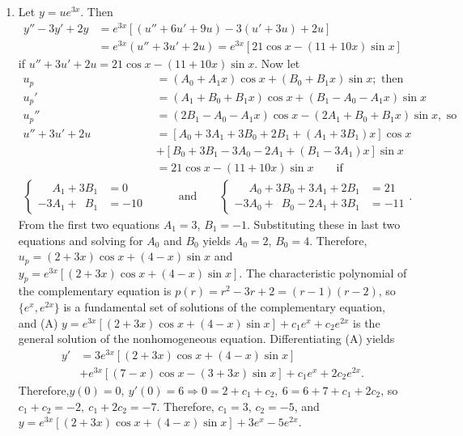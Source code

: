 \documentclass[openany]{book}
\newenvironment{sectionSolutions}{
 \begin{enumerate}[item-label={\thesection.\arabic{enumi}.}]
}{
 \end{enumerate}
}
\begin{document}
\begin{sectionSolutions}
\item
Let $y=ue^{3x}$. Then
\begin{align*}
y''-3y'+2y&=e^{3x}\left[(u''+6u'+9u)-3(u'+3u)+2u\right]\\
&=e^{3x}(u''+3u'+2u)=e^{3x}\left[21\cos x-(11+10x)\sin x\right]
\end{align*}
if $u''+3u'+2u=21\cos x-(11+10x)\sin x$.
Now let
\begin{align*}
u_p&=(A_0+A_1x)\cos x+(B_0+B_1x)\sin x; \text{ then}\\
u_p'&=(A_1+B_0+B_1x)\cos x+(B_1-A_0-A_1x)\sin x\\
u_p''&=(2B_1-A_0-A_1x)\cos x-(2A_1+B_0+B_1x)\sin x, \text{ so}\\
u''+3u'+2u&=\left[A_0+3A_1+3B_0+2B_1+(A_1+3B_1)x\right]\cos x\\
&+\left[B_0+3 B_1-3A_0-2A_1+(B_1-3A_1)x\right]\sin x \\
&=21\cos x-(11+10x)\sin x \qquad\text{if}\\
\begin{cases}
\phantom{-3}A_1+3B_1&=0\\ -3A_1+\phantom{3}B_1&=-10
\end{cases}
&\qquad\text{and}\qquad
\begin{cases}
\phantom{-3} A_0+3B_0+3A_1+2B_1&=21\\
-3A_0+\phantom{3}B_0-2A_1+3B_1&=-11
\end{cases}.
\end{align*}
From the first two equations $A_1=3$, $B_1=-1$. Substituting these in
last two equations %
and solving for $A_0$ and $B_0$ yields
$A_0=2$, $B_0=4$. Therefore,
$u_p=(2+3x)\cos x+(4-x)\sin x$ and
$y_p=e^{3x}\left[(2+3x)\cos x+(4-x)\sin x\right]$.
The characteristic polynomial of the complementary equation is
$p(r)=r^2-3r+2=(r-1)(r-2)$, so $\{e^x,e^{2x}\}$ is a fundamental
set of solutions of the complementary equation, and
(A) $y=e^{3x}\left[(2+3x)\cos x+(4-x)\sin x\right]+c_1e^x+c_2e^{2x}$
is the general solution of the nonhomogeneous
equation. Differentiating (A) yields
\begin{align*}
y'&=3e^{3x}\left[(2+3x)\cos x+(4-x)\sin x\right]\\
&+e^{3x}\left[(7-x)\cos x-(3+3x)\sin x\right]+c_1e^x+2c_2e^{2x}.
\end{align*}
 Therefore,$y(0)=0,\ y'(0)=6\Rightarrow 0=2+c_1+c_2,\
6=6+7+c_1+2c_2$, so $c_1+c_2=-2,\ c_1+2c_2=-7$.  Therefore,
$c_1=3$, $c_2=-5$, and
 $y=e^{3x}\left[(2+3x)\cos x+(4-x)\sin x\right]+3e^x-5e^{2x}$.



\end{sectionSolutions}
\end{document}
